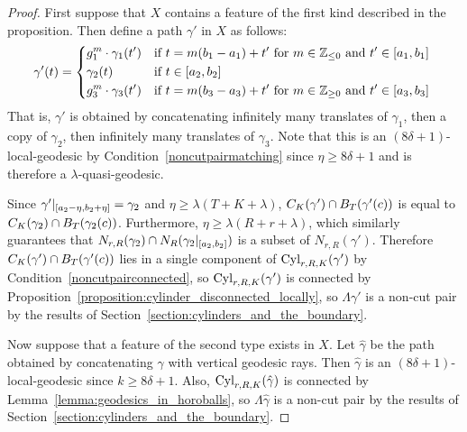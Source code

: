 \begin{proof} 
  First suppose that $X$ contains a feature of the first kind described in the proposition.  
  Then define a path $\gamma'$ in $X$ as follows:
  \begin{align} \gamma'(t) = 
    \begin{dcases}
      g_1^m \cdot \gamma_1(t') & \text{if $t = m(b_1 - a_1) + t'$ for 
        $m \in \mathbb{Z}_{\leq 0}$ and $t' \in [a_1, b_1]$ }\\
      \gamma_2(t) & \text{if $t \in [a_2, b_2]$}\\
      g_3^m \cdot \gamma_3(t') & \text{if $t = m(b_3 - a_3) + t'$ for 
        $m \in \mathbb{Z}_{\geq 0}$ and $t' \in [a_3, b_3]$ }\\
    \end{dcases}
  \end{align}
  That is, $\gamma'$ is obtained by concatenating infinitely many translates of $\gamma_1$, then a copy of $\gamma_2$, then infinitely many translates of $\gamma_3$. 
  Note that this is an $(8\delta + 1)$-local-geodesic by Condition~\ref{noncutpairmatching} since $\eta \geq 8\delta + 1$ and is therefore a $\lambda$-quasi-geodesic.

  Since $\gamma'\vert_{[a_2 - \eta, b_2 + \eta]} = \gamma_2$ and $\eta \geq \lambda(T + K + \lambda)$, $C_K(\gamma') \cap B_{T}(\gamma'(c))$ is equal to $C_K(\gamma_2) \cap B_{T}(\gamma_2(c))$.
  Furthermore, $\eta \geq \lambda (R + r + \lambda)$, which similarly guarantees that $N_{r, R}(\gamma_2) \cap N_R(\gamma_2\vert_{[a_2, b_2]})$ is a subset of $N_{r, R}(\gamma')$. 
  Therefore $C_K(\gamma') \cap B_{T}(\gamma'(c))$ lies in a single component of $\operatorname{Cyl}_{r, R, K}(\gamma')$ by Condition~\ref{noncutpairconnected}, so $\operatorname{Cyl}_{r, R, K}(\gamma')$ is connected by Proposition~\ref{proposition:cylinder_disconnected_locally}, so $\Lambda\gamma'$ is a non-cut pair by the results of Section~\ref{section:cylinders_and_the_boundary}.

  Now suppose that a feature of the second type exists in $X$. 
  Let $\hat\gamma$ be the path obtained by concatenating $\gamma$ with vertical geodesic rays.  
  Then $\hat\gamma$ is an $(8\delta+1)$-local-geodesic since $k \geq 8\delta+1$.  
  Also, $\operatorname{Cyl}_{r, R, K}(\hat\gamma)$ is connected by Lemma~\ref{lemma:geodesics_in_horoballs}, so $\Lambda\hat\gamma$ is a non-cut pair by the results of Section~\ref{section:cylinders_and_the_boundary}.


\end{proof}
